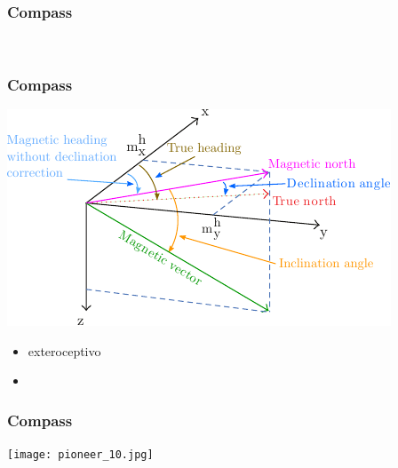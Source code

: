 \begin{frame}
    \frametitle{Compass}
    \begin{figure}[!h]        
        \centering
        \\
    \end{figure}
\end{frame}


\begin{frame}
    \frametitle{Compass}

    \begin{center}
        \includegraphics[width=0.5\columnwidth]{images/magnetic_field.pdf}
    \end{center}

    \begin{itemize}
        \item exteroceptivo
        \item
    \end{itemize}
\end{frame}

\begin{frame}
    \frametitle{Compass}

    \begin{center}
        \texttt{[image: pioneer\_10.jpg]}
    \end{center}
\end{frame}